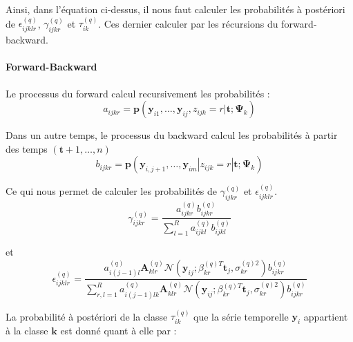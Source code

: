 \documentclass[11pt]{article}
\newcommand{\cN}{\mathcal{N}}
\newcommand{\bsy}{\boldsymbol{y}}
\newcommand{\bsp}{\boldsymbol{p}}
\newcommand{\bsk}{\boldsymbol{k}}
\newcommand{\bst}{\boldsymbol{t}}
\newcommand{\bsA}{\boldsymbol{A}}
\newcommand{\ciz}{\textit{z}}
\newcommand{\cia}{\textit{a}}
\newcommand{\cib}{\textit{b}}
\newcommand{\cir}{\textit{r}}
\newcommand{\bA}{\mathbf{A}}
\newcommand{\bsPsi}{\boldsymbol{\Psi}}
\begin{document}
Ainsi, dans l'équation ci-dessus, il nous faut calculer les probabilités à postériori de $\epsilon_{ijklr}^{(q)}$,  $\gamma_{ijkr}^{(q)}$ et $\tau_{ik}^{(q)}$. Ces dernier calculer par les récursions du forward-backward. \\



\paragraph{Forward-Backward}

Le processus du forward calcul recursivement les probabilités :\\

\begin{equation}
\cia_{ijkr} =\bsp ( \bsy_{i1},\ldots,\bsy_{ij}, \ciz_{ijk} = \cir | \bst ; \bsPsi_{k})
\end{equation}

Dans un autre temps, le processus du backward calcul les probabilités à partir des temps $(\bst+1, \ldots, n)$\\

\begin{equation}
\cib_{ijkr} =\bsp ( \bsy_{i,j+1},\ldots,\bsy_{im} | \ciz_{ijk} = \cir| \bst ; \bsPsi_{k})
\end{equation}

Ce qui nous permet de calculer les probabilités de $\gamma_{ijkr}^{(q)}$ et $\epsilon_{ijklr}^{(q)}$.\\

\begin{equation}
\gamma_{ijkr}^{(q)} = \frac{ \cia_{ijkr}^{(q)} \cib_{ijkr}^{(q)}}{ \sum_{l=1}^{R} \cia_{ijkl}^{(q)} \cib_{ijkl}^{(q)}}
\end{equation}

et \\

\begin{equation}
\epsilon_{ijklr}^{(q)} = \frac{\cia_{i(j-1)l}^{(q)} \bsA_{klr}^{(q)} \cN (\bsy_{ij} ; \beta_{kr}^{(q)T} \bst_{j}, \sigma_{kr}^{(q)2}) \cib_{ijkr}^{(q)}}{\sum_{r,l=1}^{R} \cia_{i(j-1)lk}^{(q)} \bA_{klr}^{(q)} \cN (\bsy_{ij} ; \beta_{kr}^{(q)T} \bst_{j}, \sigma_{kr}^{(q)2}) \cib_{ijkr}^{(q)}}
\end{equation}


La probabilité à postériori de la classe $\tau_{ik}^{(q)}$ que la série temporelle $\bsy_{i}$ appartient à la classe $\bsk$ est donné quant à elle par : \\
\end{document}
